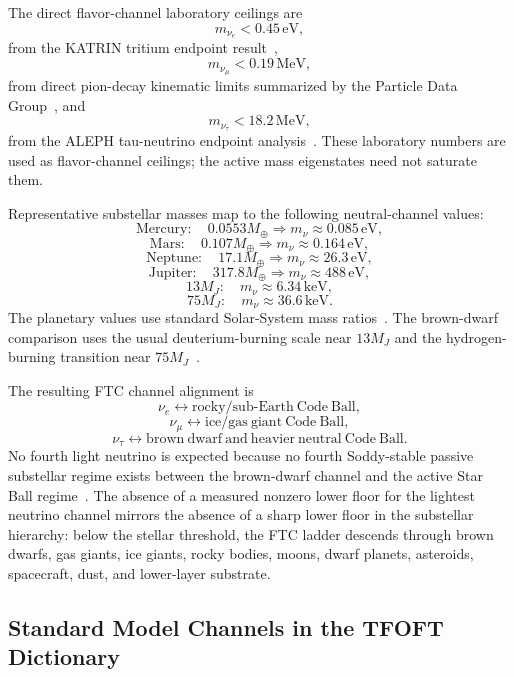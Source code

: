 \documentclass[11pt,a4paper]{article}
\begin{document}
    The direct flavor-channel laboratory ceilings are
    \[
    m_{\nu_e}<0.45\,\mathrm{eV},
    \]
    from the KATRIN tritium endpoint result~\cite{KATRIN2025},
    \[
    m_{\nu_\mu}<0.19\,\mathrm{MeV},
    \]
    from direct pion-decay kinematic limits summarized by the Particle Data Group~\cite{PDG2024}, and
    \[
    m_{\nu_\tau}<18.2\,\mathrm{MeV},
    \]
    from the ALEPH tau-neutrino endpoint analysis~\cite{ALEPH1998TauNu}. These laboratory numbers are used as flavor-channel ceilings; the active mass eigenstates need not saturate them.

    Representative substellar masses map to the following neutral-channel values:
    \[
    \mathrm{Mercury}:\quad 0.0553M_\oplus\Rightarrow m_\nu\approx0.085\,\mathrm{eV},
    \]
    \[
    \mathrm{Mars}:\quad 0.107M_\oplus\Rightarrow m_\nu\approx0.164\,\mathrm{eV},
    \]
    \[
    \mathrm{Neptune}:\quad 17.1M_\oplus\Rightarrow m_\nu\approx26.3\,\mathrm{eV},
    \]
    \[
    \mathrm{Jupiter}:\quad 317.8M_\oplus\Rightarrow m_\nu\approx488\,\mathrm{eV},
    \]
    \[
    13M_J:\quad m_\nu\approx6.34\,\mathrm{keV},
    \]
    \[
    75M_J:\quad m_\nu\approx36.6\,\mathrm{keV}.
    \]
    The planetary values use standard Solar-System mass ratios~\cite{NASAPlanetaryFactSheet}. The brown-dwarf comparison uses the usual deuterium-burning scale near \(13M_J\) and the hydrogen-burning transition near \(75M_J\)~\cite{Spiegel2011}.

    The resulting FTC channel alignment is
    \[
    \nu_e \leftrightarrow \mathrm{rocky/sub\mbox{-}Earth\ Code\ Ball},
    \]
    \[
    \nu_\mu \leftrightarrow \mathrm{ice/gas\ giant\ Code\ Ball},
    \]
    \[
    \nu_\tau \leftrightarrow \mathrm{brown\ dwarf\ and\ heavier\ neutral\ Code\ Ball}.
    \]
    No fourth light neutrino is expected because no fourth Soddy-stable passive substellar regime exists between the brown-dwarf channel and the active Star Ball regime~\cite{NuFIT2024}. The absence of a measured nonzero lower floor for the lightest neutrino channel mirrors the absence of a sharp lower floor in the substellar hierarchy: below the stellar threshold, the FTC ladder descends through brown dwarfs, gas giants, ice giants, rocky bodies, moons, dwarf planets, asteroids, spacecraft, dust, and lower-layer substrate.

  \subsection{Standard Model Channels in the TFOFT Dictionary}
\end{document}

